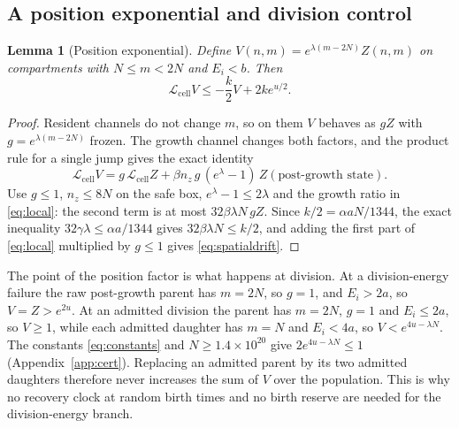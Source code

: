 \documentclass[11pt,a4paper]{article}
\theoremstyle{plain}
\newtheorem{lemma}[theorem]{Lemma}
\theoremstyle{definition}
\theoremstyle{remark}
\newcommand{\cL}{\mathcal L}
\begin{document}
\subsection{A position exponential and division control}
\begin{lemma}[Position exponential]\label{lem:spatial}
Define $V(n,m)=e^{\lambda(m-2N)}Z(n,m)$ on compartments with $N\leq m<2N$ and $E_i<b$. Then
\begin{equation}\label{eq:spatialdrift}
\cL_{\mathrm{cell}}V\leq-\frac k2V+2ke^{u/2}.
\end{equation}
\end{lemma}
\begin{proof}
Resident channels do not change $m$, so on them $V$ behaves as $g Z$ with $g=e^{\lambda(m-2N)}$ frozen. The growth channel changes both factors, and the product rule for a single jump gives the exact identity
\[
\cL_{\mathrm{cell}}V=g\,\cL_{\mathrm{cell}}Z+\beta n_z\,g\,(e^{\lambda}-1)\,Z(\text{post-growth state}).
\]
Use $g\leq1$, $n_z\leq8N$ on the safe box, $e^\lambda-1\leq2\lambda$ and the growth ratio in \eqref{eq:local}: the second term is at most $32\beta\lambda N\,gZ$. Since $k/2=\alpha aN/1344$, the exact inequality $32\gamma\lambda\leq\alpha a/1344$ gives $32\beta\lambda N\leq k/2$, and adding the first part of \eqref{eq:local} multiplied by $g\leq1$ gives \eqref{eq:spatialdrift}.
\end{proof}

The point of the position factor is what happens at division. At a division-energy failure the raw post-growth parent has $m=2N$, so $g=1$, and $E_i>2a$, so $V=Z>e^{2u}$. At an admitted division the parent has $m=2N$, $g=1$ and $E_i\leq2a$, so $V\geq1$, while each admitted daughter has $m=N$ and $E_i<4a$, so $V<e^{4u-\lambda N}$. The constants \eqref{eq:constants} and $N\geq1.4\times10^{20}$ give $2e^{4u-\lambda N}\leq1$ (Appendix~\ref{app:cert}). Replacing an admitted parent by its two admitted daughters therefore never increases the sum of $V$ over the population. This is why no recovery clock at random birth times and no birth reserve are needed for the division-energy branch.
\end{document}
